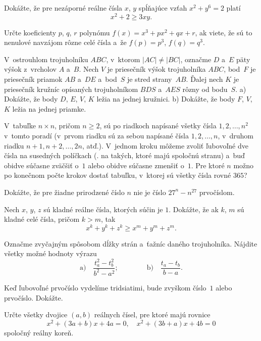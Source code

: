 {%
Dokážte, že pre nezáporné reálne čísla $x$, $y$ spĺňajúce vzťah
$x^2+y^6=2$ platí
$$
x^2+2\ge 3xy.
$$}

{%
Určte koeficienty $p$, $q$, $r$ polynómu $f(x)=x^3+px^2+qx+r$, ak
viete, že sú to nenulové navzájom rôzne celé čísla a~že $f(p)=p^3$, $f(q)=q^3$.}

{%
V~ostrouhlom trojuholníku $ABC$, v~ktorom $|AC|\ne|BC|$, označme $D$ a~$E$ päty výšok z~vrcholov $A$ a~$B$. Nech $V$ je priesečník výšok trojuholníka $ABC$, bod~$F$ je priesečník priamok $AB$ a~$DE$ a~bod~$S$ je stred strany~$AB$. Ďalej nech $K$ je priesečník kružníc opísaných trojuholníkom $BDS$ a~$AES$ rôzny od bodu~$S$.
\ite a) Dokážte, že body $D$, $E$, $V$, $K$ ležia na jednej kružnici.
\ite b) Dokážte, že body $F$, $V$, $K$ ležia na jednej priamke.}

{%
V~tabuľke $n\times n$, pričom $n\ge2$, sú po riadkoch napísané všetky čísla $1,2,\dots,n^2$ v~tomto poradí (v~prvom riadku sú za sebou napísané čísla $1,2,\dots,n$, v~druhom riadku $n+1, n+2,\dots, 2n$, atď.). V~jednom kroku môžeme zvoliť ľubovoľné dve čísla na susedných políčkach (\tj. na takých, ktoré majú spoločnú stranu) a~buď obidve súčasne zväčšiť o~$1$ alebo obidve súčasne zmenšiť o~$1$. Pre ktoré $n$ možno po konečnom počte krokov dostať tabuľku, v~ktorej sú všetky čísla rovné $365$?}

{%
Dokážte, že pre žiadne prirodzené číslo $n$ nie je číslo $27^n-n^{27}$ prvočíslom.}

{%
Nech $x$, $y$, $z$ sú kladné reálne čísla, ktorých súčin je $1$. Dokážte, že ak $k$, $m$ sú kladné celé
čísla, pričom $k>m$, tak
$$
x^k+y^k+z^k \ge x^m + y^m + z^m.
$$}

{%
Označme zvyčajným spôsobom dĺžky strán a~ťažníc daného trojuholníka. Nájdite všetky možné hodnoty výrazu
$$
\text{a)}\quad\frac{t_a^2-t_b^2}{b^2-a^2};\qquad\qquad
\text{b)}\quad\frac{t_a-t_b}{b-a}.
$$}

{%
Keď ľubovoľné prvočíslo vydelíme tridsiatimi,
bude zvyškom číslo~$1$ alebo prvočíslo. Dokážte.}

{%
Určte všetky dvojice $(a,b)$ reálnych čísel, pre ktoré majú rovnice
$$
x^2+(3a+b)x+4a=0,\quad x^2+(3b+a)x+4b=0
$$
spoločný reálny koreň.}

